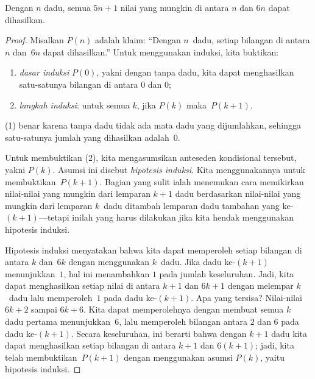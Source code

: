 \documentclass[../../../include/open-logic-section]{subfiles}
\begin{document}
\begin{thm}
  Dengan $n$ dadu, semua $5n+1$ nilai yang mungkin di antara $n$ dan $6n$
  dapat dihasilkan.
\end{thm}

\begin{proof}
Misalkan $P(n)$ adalah klaim: ``Dengan $n$~dadu, setiap bilangan di antara
$n$ dan~$6n$ dapat dihasilkan.'' Untuk menggunakan induksi, kita buktikan:
\begin{enumerate}
\item \emph{dasar induksi} $P(0)$, yakni dengan tanpa dadu, kita dapat
  menghasilkan satu-satunya bilangan di antara $0$ dan $0$;
\item \emph{langkah induksi}: untuk semua $k$, jika $P(k)$ maka~$P(k+1)$.
\end{enumerate}

(1) benar karena tanpa dadu tidak ada mata dadu yang dijumlahkan, sehingga
satu-satunya jumlah yang dihasilkan adalah~$0$.

Untuk membuktikan (2), kita mengasumsikan anteseden kondisional tersebut,
yakni $P(k)$. Asumsi ini disebut \emph{hipotesis induksi}. Kita
menggunakannya untuk membuktikan~$P(k+1)$. Bagian yang sulit ialah menemukan
cara memikirkan nilai-nilai yang mungkin dari lemparan $k+1$ dadu berdasarkan
nilai-nilai yang mungkin dari lemparan $k$~dadu ditambah lemparan dadu
tambahan yang ke-$(k+1)$---tetapi inilah yang harus dilakukan jika kita
hendak menggunakan hipotesis induksi.

Hipotesis induksi menyatakan bahwa kita dapat memperoleh setiap bilangan di
antara $k$ dan~$6k$ dengan menggunakan $k$~dadu. Jika dadu ke-$(k+1)$
menunjukkan~$1$, hal ini menambahkan $1$ pada jumlah keseluruhan. Jadi, kita
dapat menghasilkan setiap nilai di antara $k+1$ dan $6k+1$ dengan melempar
$k$~dadu lalu memperoleh~$1$ pada dadu ke-$(k+1)$. Apa yang tersisa?
Nilai-nilai $6k+2$ sampai $6k+6$. Kita dapat memperolehnya dengan membuat
semua $k$ dadu pertama menunjukkan~$6$, lalu memperoleh bilangan antara $2$
dan $6$ pada dadu ke-$(k+1)$. Secara keseluruhan, ini berarti bahwa dengan
$k+1$ dadu kita dapat menghasilkan setiap bilangan di antara $k+1$ dan
$6(k+1)$; jadi, kita telah membuktikan~$P(k+1)$ dengan menggunakan asumsi
$P(k)$, yaitu hipotesis induksi.
\end{proof}
\end{document}

